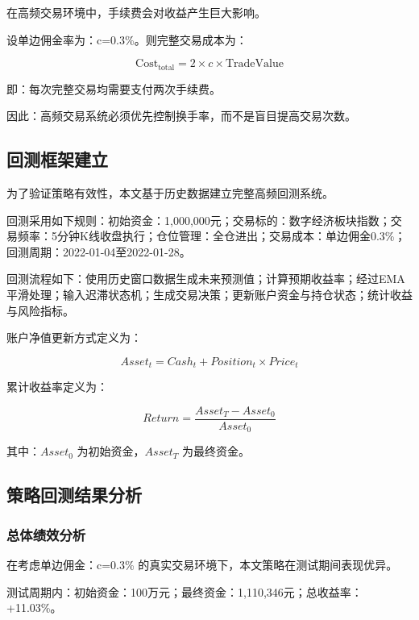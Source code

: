 \documentclass[withoutpreface,bwprint]{cumcmthesis}
\begin{document}
在高频交易环境中，手续费会对收益产生巨大影响。

设单边佣金率为：c=0.3\%。则完整交易成本为：

\begin{equation}
    \text{Cost}_{\text{total}} = 2 \times c \times \text{TradeValue}
    \label{eq:trade_cost}
\end{equation}

即：每次完整交易均需要支付两次手续费。

因此：高频交易系统必须优先控制换手率，而不是盲目提高交易次数。

\subsection{回测框架建立}

为了验证策略有效性，本文基于历史数据建立完整高频回测系统。

回测采用如下规则：初始资金：1,000,000元；交易标的：数字经济板块指数；交易频率：5分钟K线收盘执行；仓位管理：全仓进出；交易成本：单边佣金0.3\%；回测周期：2022-01-04至2022-01-28。

回测流程如下：使用历史窗口数据生成未来预测值；计算预期收益率；经过EMA平滑处理；输入迟滞状态机；生成交易决策；更新账户资金与持仓状态；统计收益与风险指标。

账户净值更新方式定义为：

\begin{equation}
Asset_t = Cash_t + Position_t \times Price_t
\end{equation}

累计收益率定义为：

\begin{equation}
Return=\frac{Asset_T-Asset_0}{Asset_0}
\end{equation}

其中：$Asset_0$ 为初始资金，$Asset_T$ 为最终资金。

\subsection{策略回测结果分析}

\subsubsection{总体绩效分析}

在考虑单边佣金：c=0.3\% 的真实交易环境下，本文策略在测试期间表现优异。

测试周期内：初始资金：100万元；最终资金：1,110,346元；总收益率：+11.03\%。
\end{document}
